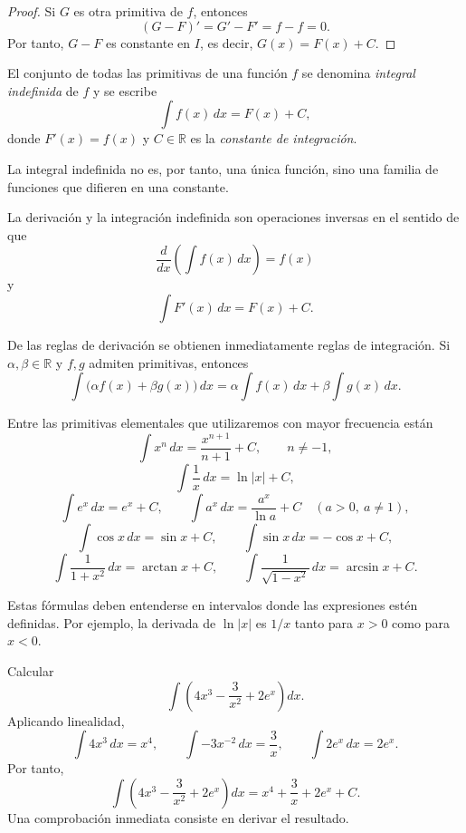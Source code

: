 \begin{proof}
Si $G$ es otra primitiva de $f$, entonces
\[
(G-F)'=G'-F'=f-f=0.
\]
Por tanto, $G-F$ es constante en $I$, es decir, $G(x)=F(x)+C$.
\end{proof}

\begin{definition}
El conjunto de todas las primitivas de una función $f$ se denomina \emph{integral indefinida} de $f$ y se escribe
\[
\int f(x)\,dx=F(x)+C,
\]
donde $F'(x)=f(x)$ y $C\in\mathbb{R}$ es la \emph{constante de integración}.
\end{definition}

La integral indefinida no es, por tanto, una única función, sino una familia de funciones que difieren en una constante.

La derivación y la integración indefinida son operaciones inversas en el sentido de que
\[
\frac{d}{dx}\left(\int f(x)\,dx\right)=f(x)
\]
y
\[
\int F'(x)\,dx=F(x)+C.
\]

De las reglas de derivación se obtienen inmediatamente reglas de integración. Si $\alpha,\beta\in\mathbb{R}$ y $f,g$ admiten primitivas, entonces
\[
\int \bigl(\alpha f(x)+\beta g(x)\bigr)\,dx
=
\alpha\int f(x)\,dx+\beta\int g(x)\,dx.
\]

Entre las primitivas elementales que utilizaremos con mayor frecuencia están
\[
\int x^n\,dx=\frac{x^{n+1}}{n+1}+C,\qquad n\neq-1,
\]
\[
\int \frac1x\,dx=\ln|x|+C,
\]
\[
\int e^x\,dx=e^x+C,
\qquad
\int a^x\,dx=\frac{a^x}{\ln a}+C\quad (a>0,\ a\neq1),
\]
\[
\int \cos x\,dx=\sin x+C,
\qquad
\int \sin x\,dx=-\cos x+C,
\]
\[
\int \frac{1}{1+x^2}\,dx=\arctan x+C,
\qquad
\int \frac{1}{\sqrt{1-x^2}}\,dx=\arcsin x+C.
\]

Estas fórmulas deben entenderse en intervalos donde las expresiones estén definidas. Por ejemplo, la derivada de $\ln|x|$ es $1/x$ tanto para $x>0$ como para $x<0$.

\begin{example}
Calcular
\[
\int \left(4x^3-\frac{3}{x^2}+2e^x\right)dx.
\]
Aplicando linealidad,
\[
\int4x^3\,dx=x^4,
\qquad
\int -3x^{-2}\,dx=\frac{3}{x},
\qquad
\int2e^x\,dx=2e^x.
\]
Por tanto,
\[
\boxed{\int \left(4x^3-\frac{3}{x^2}+2e^x\right)dx
=x^4+\frac3x+2e^x+C.}
\]
Una comprobación inmediata consiste en derivar el resultado.
\end{example}


